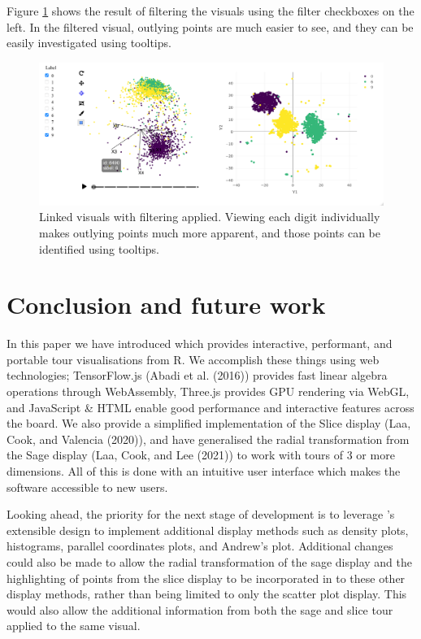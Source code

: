 Figure \ref{fig:linked-tsne-filter} shows the result of filtering the visuals using the filter checkboxes on the left. In the filtered visual, outlying points are much easier to see, and they can be easily investigated using tooltips.

\begin{figure}
\includegraphics[width=\textwidth]{figures/mnist/case-study-linked-brushing-filter} \caption{Linked visuals with filtering applied. Viewing each digit individually makes outlying points much more apparent, and those points can be identified using tooltips.}\label{fig:linked-tsne-filter}
\end{figure}

\hypertarget{conclusion-and-future-work}{%
\section{Conclusion and future work}\label{conclusion-and-future-work}}

In this paper we have introduced  which provides interactive, performant, and portable tour visualisations from R. We accomplish these things using web technologies; TensorFlow.js (Abadi et al. (2016)) provides fast linear algebra operations through WebAssembly, Three.js provides GPU rendering via WebGL, and JavaScript \& HTML enable good performance and interactive features across the board. We also provide a simplified implementation of the Slice display (Laa, Cook, and Valencia (2020)), and have generalised the radial transformation from the Sage display (Laa, Cook, and Lee (2021)) to work with tours of 3 or more dimensions. All of this is done with an intuitive user interface which makes the software accessible to new users.

Looking ahead, the priority for the next stage of development is to leverage 's extensible design to implement additional display methods such as density plots, histograms, parallel coordinates plots, and Andrew's plot. Additional changes could also be made to allow the radial transformation of the sage display and the highlighting of points from the slice display to be incorporated in to these other display methods, rather than being limited to only the scatter plot display. This would also allow the additional information from both the sage and slice tour applied to the same visual.

